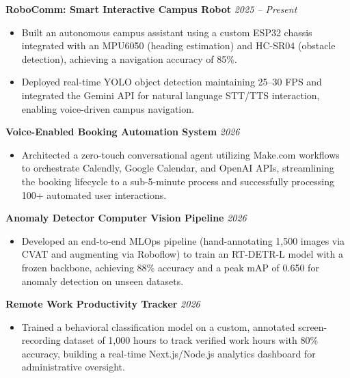 \documentclass[11pt, a4paper]{article}
\begin{document}
\textbf{RoboComm: Smart Interactive Campus Robot} \hfill \textit{2025 -- Present}
\begin{itemize}[leftmargin=0.25in, itemsep=2pt]
    \item Built an autonomous campus assistant using a custom ESP32 chassis integrated with an MPU6050 (heading estimation) and HC-SR04 (obstacle detection), achieving a navigation accuracy of 85\%.
    \item Deployed real-time YOLO object detection maintaining 25--30 FPS and integrated the Gemini API for natural language STT/TTS interaction, enabling voice-driven campus navigation.
\end{itemize}

\textbf{Voice-Enabled Booking Automation System} \hfill \textit{2026}
\begin{itemize}[leftmargin=0.25in, itemsep=2pt]
    \item Architected a zero-touch conversational agent utilizing Make.com workflows to orchestrate Calendly, Google Calendar, and OpenAI APIs, streamlining the booking lifecycle to a sub-5-minute process and successfully processing 100+ automated user interactions.
\end{itemize}

\textbf{Anomaly Detector Computer Vision Pipeline} \hfill \textit{2026}
\begin{itemize}[leftmargin=0.25in, itemsep=2pt]
    \item Developed an end-to-end MLOps pipeline (hand-annotating 1,500 images via CVAT and augmenting via Roboflow) to train an RT-DETR-L model with a frozen backbone, achieving 88\% accuracy and a peak mAP of 0.650 for anomaly detection on unseen datasets.
\end{itemize}

\textbf{Remote Work Productivity Tracker} \hfill \textit{2026}
\begin{itemize}[leftmargin=0.25in, itemsep=2pt]
    \item Trained a behavioral classification model on a custom, annotated screen-recording dataset of 1,000 hours to track verified work hours with 80\% accuracy, building a real-time Next.js/Node.js analytics dashboard for administrative oversight.
\end{itemize}
\end{document}
